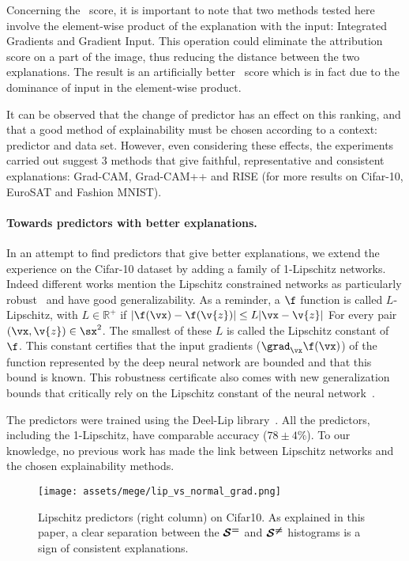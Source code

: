 Concerning the \representativity~score, it is important to note that two methods tested here involve the element-wise product of the explanation with the input: Integrated Gradients and Gradient Input. This operation could eliminate the attribution score on a part of the image, thus reducing the distance between the two explanations. The result is an artificially better \mege~score which is in fact due to the dominance of input in the element-wise product.

It can be observed that the change of predictor has an effect on this ranking, and that a good method of explainability must be chosen according to a context: predictor and data set. However, even considering these effects, the experiments carried out suggest $3$ methods that give faithful, representative and consistent explanations: Grad-CAM, Grad-CAM++ and RISE (for more results on Cifar-10, EuroSAT and Fashion MNIST).

\paragraph{Towards predictors with better explanations.} In an attempt to find predictors that give better explanations, we extend the experience on the Cifar-10 dataset by adding a family of 1-Lipschitz networks. Indeed different works mention the Lipschitz constrained networks as particularly robust~\cite{usama2018robust, scaman2019lipschitz, pauli2020training, louislip} and have good generalizability. As a reminder, a $\f$ function is called $L$-Lipschitz, with $L \in \mathbb{R}^+$ if 
$| \f(\vx) - \f(\v{z}) | \leq L |\vx - \v{z}|$
For every pair $(\vx, \v{z}) \in \sx^2$. The smallest of these $L$ is called the Lipschitz constant of $\f$. This constant certifies that the input gradients ($\grad_{\vx} \f(\vx)$) of the function represented by the deep neural network are bounded and that this bound is known. This robustness certificate also comes with new generalization bounds that critically rely on the Lipschitz constant of the neural network~\cite{von2004distance, neyshabur2017exploring, bartlett2017spectrallynormalized}.

The predictors were trained using the Deel-Lip library~\cite{deelLip}. All the predictors, including the 1-Lipschitz, have comparable accuracy ($78 \pm 4\%$). To our knowledge, no previous work has made the link between Lipschitz networks and the chosen explainability methods.

\begin{figure}[ht]
    \centering
    \texttt{[image: assets/mege/lip\_vs\_normal\_grad.png]}
    \caption{Lipschitz predictors (right column) on Cifar10.
    As explained in this paper, a clear separation between the $\boldsymbol{\mathcal{S}^{ = }}$ and $\boldsymbol{\mathcal{S}^{ \ne }}$ histograms is a sign of consistent explanations.
    }
    \label{fig:lipVsNormalDistrib}
\end{figure}

